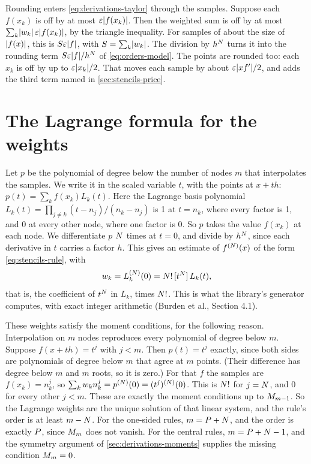 Rounding enters \cref{eq:derivations-taylor} through the samples. Suppose each $f(x_k)$ is off by at most
$\varepsilon \lvert f(x_k) \rvert$. Then the weighted sum is off by at most $\sum_k \lvert w_k \rvert\, \varepsilon \lvert f(x_k) \rvert$, by the
triangle inequality. For samples of about the size of $\lvert f(x) \rvert$, this is $S \varepsilon \lvert f \rvert$, with
$S = \sum_k \lvert w_k \rvert$. The division by $h^{N}$ turns it into the rounding term
$S \varepsilon \lvert f \rvert / h^{N}$ of \cref{eq:orders-model}. The points are rounded too: each $x_k$ is off by up
to $\varepsilon \lvert x_k \rvert / 2$. That moves each sample by about $\varepsilon \lvert x f' \rvert / 2$, and adds the third term named
in \cref{sec:stencils-price}.

\section{The Lagrange formula for the weights}\label{sec:derivations-lagrange}

Let $p$ be the polynomial of degree below the number of nodes $m$ that interpolates the samples. We write it in the
scaled variable $t$, with the points at $x + t h$: $p(t) = \sum_k f(x_k) L_k(t)$. Here the Lagrange basis polynomial
$L_k(t) = \prod_{j \ne k} (t - n_j) / (n_k - n_j)$ is 1 at $t = n_k$, where every factor is 1, and 0 at every other
node, where one factor is 0. So $p$ takes the value $f(x_k)$ at each node. We differentiate $p$ $N$ times at
$t = 0$, and divide by $h^{N}$, since each derivative in $t$ carries a factor $h$. This gives an estimate of
$f^{(N)}(x)$ of the form \cref{eq:stencils-rule}, with
\begin{equation}
  w_k = L_k^{(N)}(0) = N!\,[t^{N}]\, L_k(t),
  \label{eq:derivations-lagrange}
\end{equation}
that is, the coefficient of $t^{N}$ in $L_k$, times $N!$. This is what the library's generator computes,
with exact integer arithmetic (Burden et al.,\cite{burden2016} Section 4.1).

These weights satisfy the moment conditions, for the following reason. Interpolation on $m$ nodes reproduces every
polynomial of degree below $m$. Suppose $f(x + t h) = t^j$ with $j < m$. Then $p(t) = t^j$ exactly, since both sides
are polynomials of degree below $m$ that agree at $m$ points. (Their difference has degree below $m$ and $m$ roots,
so it is zero.) For that $f$ the samples are $f(x_k) = n_k^j$, so $\sum_k w_k n_k^j = p^{(N)}(0) =
(t^j)^{(N)}(0)$. This is $N!$ for $j = N$, and 0 for every other $j < m$. These are exactly the
moment conditions up to $M_{m-1}$. So the Lagrange weights are the unique solution of that linear system, and the
rule's order is at least $m - N$. For the one-sided rules, $m = P + N$, and the order is exactly
$P$, since $M_{m}$ does not vanish. For the central rules, $m = P + N - 1$, and the symmetry
argument of \cref{sec:derivations-moments} supplies the missing condition $M_{m} = 0$.

